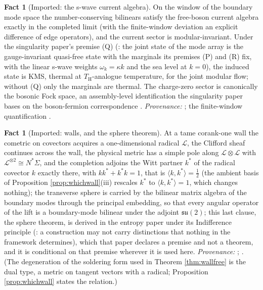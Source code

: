 \documentclass[11pt]{article}
\theoremstyle{definition}
\newtheorem{fact}[theorem]{Fact}
\newcommand{\ip}[2]{\langle #1, #2\rangle}
\renewcommand{\TH}{T_{\mathrm{H}}} %
\begin{document}
\begin{fact}[Imported: the s-wave current algebra]\label{fact:current}
On the window of the boundary mode space the number-conserving bilinears satisfy the free-boson current algebra exactly in the completed limit (with the finite-window deviation an explicit difference of edge operators), and the current sector is modular-invariant. Under the singularity paper's premise (Q) (\cite[Premise~8.1]{ButlerT5}: the joint state of the mode array is the gauge-invariant quasi-free state with the marginals its premises (P) and (R) fix, with the linear s-wave weights $\omega_k = \kappa k$ and the sea level at $k = 0$), the induced state is KMS, thermal at $\TH$-analogue temperature, for the joint modular flow; without (Q) only the marginals are thermal. The charge-zero sector is canonically the bosonic Fock space, an assembly-level identification the singularity paper bases on the boson-fermion correspondence \cite{PressleySegal1986}. \emph{Provenance:} \cite[\S 8, Premise~8.1]{ButlerT5}; the finite-window quantification \cite[\S 6]{ButlerT7}.
\end{fact}

\begin{fact}[Imported: walls, and the sphere theorem]\label{fact:walls}
At a tame corank-one wall the cometric on covectors acquires a one-dimensional radical $\mathcal{L}$, the Clifford sheaf continues across the wall, the physical metric has a simple pole along $\mathcal{L}\otimes\mathcal{L}$ with $\mathcal{L}^{\otimes 2} \cong N^*\Sigma$, and the completion adjoins the Witt partner $k^*$ of the radical covector $k$ exactly there, with $kk^* + k^*k = 1$, that is $\ip{k}{k^*} = \tfrac12$ (the ambient basis of Proposition \ref{prop:whichwall}(iii) rescales $k^*$ to $\ip{k}{k^*} = 1$, which changes nothing); the transverse sphere is carried by the bilinear matrix algebra of the boundary modes through the principal embedding, so that every angular operator of the lift is a boundary-mode bilinear under the adjoint $\mathfrak{su}(2)$; this last clause, the sphere theorem, is derived in the entropy paper under its Indifference principle (\cite[Principle~5.4]{ButlerT8}: a construction may not carry distinctions that nothing in the framework determines), which that paper declares a premise and not a theorem, and it is conditional on that premise wherever it is used here. \emph{Provenance:} \cite[Thm.~3.1, Cor.~4.5, Thm.~6.2]{ButlerT4}; \cite[Prop.~5.2, Principle~5.4, Thm.~5.5, Prop.~5.6]{ButlerT8}. (The degeneration of the soldering form used in Theorem \ref{thm:wallfree} is the dual type, a metric on tangent vectors with a radical; Proposition \ref{prop:whichwall} states the relation.)
\end{fact}
\end{document}
